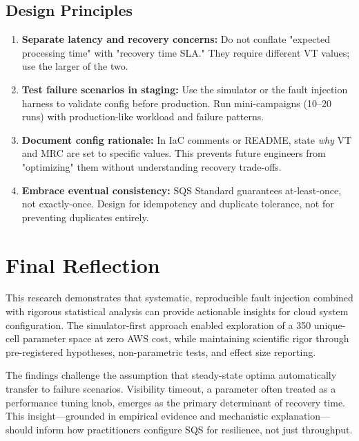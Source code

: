 \subsection{Design Principles}

\begin{enumerate}
    \item \textbf{Separate latency and recovery concerns:} Do not conflate "expected processing time" with "recovery time SLA." They require different VT values; use the larger of the two.
    
    \item \textbf{Test failure scenarios in staging:} Use the simulator or the fault injection harness to validate config before production. Run mini-campaigns (10–20 runs) with production-like workload and failure patterns.
    
    \item \textbf{Document config rationale:} In IaC comments or README, state \emph{why} VT and MRC are set to specific values. This prevents future engineers from "optimizing" them without understanding recovery trade-offs.
    
    \item \textbf{Embrace eventual consistency:} SQS Standard guarantees at-least-once, not exactly-once. Design for idempotency and duplicate tolerance, not for preventing duplicates entirely.
\end{enumerate}

\section{Final Reflection}

This research demonstrates that systematic, reproducible fault injection combined with rigorous statistical analysis can provide actionable insights for cloud system configuration. The simulator-first approach enabled exploration of a 350 unique-cell parameter space at zero AWS cost, while maintaining scientific rigor through pre-registered hypotheses, non-parametric tests, and effect size reporting.

The findings challenge the assumption that steady-state optima automatically transfer to failure scenarios. Visibility timeout, a parameter often treated as a performance tuning knob, emerges as the primary determinant of recovery time. This insight—grounded in empirical evidence and mechanistic explanation—should inform how practitioners configure SQS for resilience, not just throughput.

